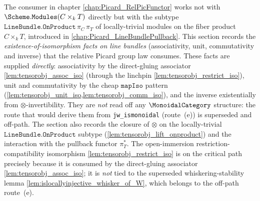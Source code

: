 The consumer in chapter \cref{chap:Picard_RelPicFunctor} works not with
\(\Scheme.\mathtt{Modules}(C \times_k T)\) directly but with the subtype
\(\texttt{LineBundle.OnProduct}\,\pi_C\,\pi_T\) of locally-trivial
modules on the fiber product \(C \times_k T\), introduced in
\cref{chap:Picard_LineBundlePullback}. This section records the
\emph{existence-of-isomorphism facts on line bundles} (associativity, unit,
commutativity and inverse) that the relative Picard group law consumes. These facts
are supplied \emph{directly}: associativity by the direct-gluing associator
\cref{lem:tensorobj_assoc_iso} (through the linchpin
\cref{lem:tensorobj_restrict_iso}), unit and commutativity by the cheap
\(\mathtt{mapIso}\) pattern (\cref{lem:tensorobj_unit_iso,lem:tensorobj_comm_iso}),
and the inverse existentially from \(\otimes\)-invertibility. They are \emph{not}
read off any \(\MonoidalCategory\) structure: the route that would derive them from
\texttt{jw\_ismonoidal} (route~(e)) is superseded and off-path. The section also
records the closure of \(\otimes\) on the locally-trivial
\(\texttt{LineBundle.OnProduct}\) subtype (\cref{lem:tensorobj_lift_onproduct}) and
the interaction with the pullback functor \(\pi_T^*\). The open-immersion
restriction-compatibility isomorphism \cref{lem:tensorobj_restrict_iso} is on the
critical path precisely because it is consumed by the direct-gluing associator
\cref{lem:tensorobj_assoc_iso}; it is \emph{not} tied to the superseded
whiskering-stability lemma \cref{lem:islocallyinjective_whisker_of_W}, which belongs
to the off-path route~(e).

